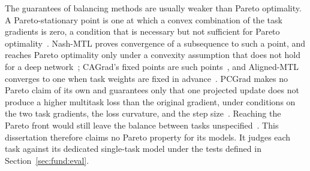The guarantees of balancing methods are usually weaker than Pareto optimality. A
Pareto-stationary point is one at which a convex combination of the task gradients is
zero, a condition that is necessary but not sufficient for Pareto
optimality~\cite{nash}. Nash-MTL proves convergence of a subsequence to such a point,
and reaches Pareto optimality only under a convexity assumption that does not hold for
a deep network~\cite{nash}; CAGrad's fixed points are such points~\cite{liu2021cagrad},
and Aligned-MTL converges to one when task weights are fixed in
advance~\cite{senushkin2023aligned}. PCGrad makes no Pareto claim of its own and
guarantees only that one projected update does not produce a higher multitask loss than
the original gradient, under conditions on the two task gradients, the loss curvature,
and the step size~\cite{yu2020pcgrad}. Reaching the Pareto front would still leave the balance
between tasks unspecified~\cite{liu2021cagrad,senushkin2023aligned}. This
dissertation therefore claims no Pareto property for its models. It judges each task
against its dedicated single-task model under the tests defined in
Section~\ref{sec:fund:eval}.
%

